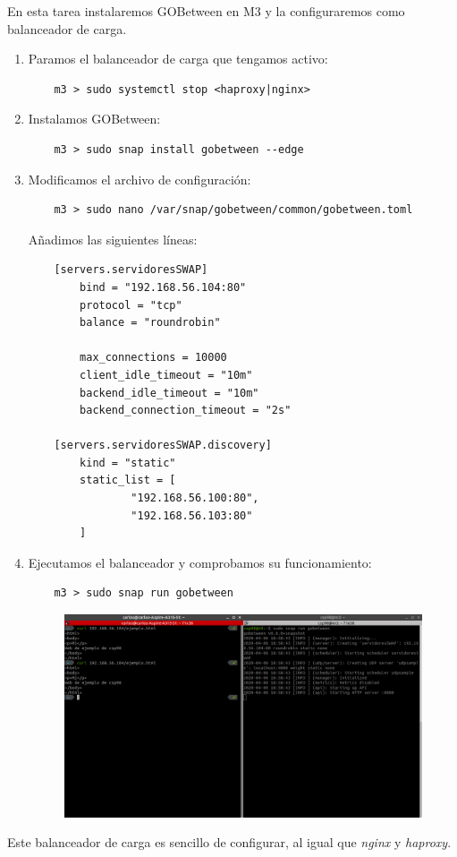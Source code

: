 \documentclass[12pt,spanish]{article}
\begin{document}
En esta tarea instalaremos GOBetween en M3 y la configuraremos como balanceador de carga.

\begin{enumerate}
	\item Paramos el balanceador de carga que tengamos activo:
	\begin{lstlisting}
	m3 > sudo systemctl stop <haproxy|nginx>
	\end{lstlisting}
	\item Instalamos GOBetween:
	\begin{lstlisting}
	m3 > sudo snap install gobetween --edge
	\end{lstlisting}
	\item Modificamos el archivo de configuración:
	\begin{lstlisting}
	m3 > sudo nano /var/snap/gobetween/common/gobetween.toml
	\end{lstlisting}
	Añadimos las siguientes líneas:
	\begin{lstlisting}
	[servers.servidoresSWAP]
		bind = "192.168.56.104:80"
		protocol = "tcp"
		balance = "roundrobin"

		max_connections = 10000
		client_idle_timeout = "10m"
		backend_idle_timeout = "10m"
		backend_connection_timeout = "2s"

	[servers.servidoresSWAP.discovery]
		kind = "static"
		static_list = [
		        "192.168.56.100:80",
		        "192.168.56.103:80"
		]
	\end{lstlisting}
	\item Ejecutamos el balanceador y comprobamos su funcionamiento:
	\begin{lstlisting}
	m3 > sudo snap run gobetween
	\end{lstlisting}
	\begin{figure}[H]
		\centering
		\includegraphics[scale=0.45]{t4/gobetween-ok.png}
	\end{figure}
\end{enumerate}

Este balanceador de carga es sencillo de configurar, al igual que \emph{nginx} y \emph{haproxy}.
\end{document}
